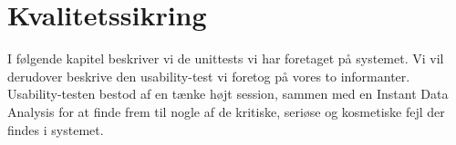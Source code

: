 \chapter{Kvalitetssikring}
\label{chap:kvalitetssikring}
I følgende kapitel beskriver vi de unittests vi har foretaget på systemet. Vi vil derudover beskrive den usability-test vi foretog på vores to informanter. Usability-testen bestod af en tænke højt session, sammen med en Instant Data Analysis for at finde frem til nogle af de kritiske, seriøse og kosmetiske fejl der findes i systemet.



